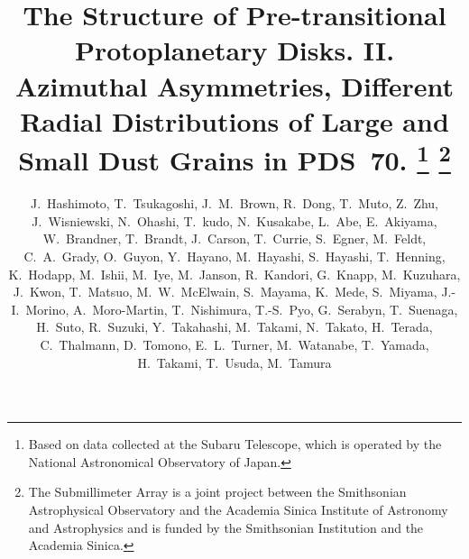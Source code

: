 \documentclass[apj]{emulateapj-rtx4}
\begin{document}
\title{The Structure of Pre-transitional Protoplanetary Disks. II. \\
  Azimuthal Asymmetries, Different Radial Distributions of Large and Small Dust Grains in PDS~70.
  \footnote{Based on data collected at the Subaru Telescope, which is operated by the National Astronomical Observatory of Japan.}
  \footnote{The Submillimeter Array is a joint project between the Smithsonian Astrophysical Observatory and the Academia Sinica Institute of Astronomy and Astrophysics and is funded by the Smithsonian Institution and the Academia Sinica.}
}

  \author{
    J.~Hashimoto, 
    T.~Tsukagoshi, 
    J.~M.~Brown, 
    R.~Dong, 
    T.~Muto, 
    Z.~Zhu, 
    J.~Wisniewski, 
    N.~Ohashi,
    T.~kudo,
    N.~Kusakabe,
    L.~Abe, 
    E.~Akiyama,
    W.~Brandner, 
    T.~Brandt, 
    J.~Carson,
    T.~Currie, 
    S.~Egner, 
    M.~Feldt, 
    C.~A.~Grady, 
    O.~Guyon, 
    Y.~Hayano,
    M.~Hayashi, 
    S.~Hayashi, 
    T.~Henning, 
    K.~Hodapp,
    M.~Ishii,
    M.~Iye, 
    M.~Janson,
    R.~Kandori, 
    G.~Knapp, 
    M.~Kuzuhara,
    J.~Kwon,
    T.~Matsuo,
    M.~W.~McElwain, 
    S.~Mayama, 
    K.~Mede,
    S.~Miyama, 
    J.-I.~Morino,
    A.~Moro-Martin, 
    T.~Nishimura, 
    T.-S.~Pyo,
    G.~Serabyn, 
    T.~Suenaga,
    H.~Suto, 
    R.~Suzuki,
    Y.~Takahashi,
    M.~Takami,
    N.~Takato, 
    H.~Terada, 
    C.~Thalmann, 
    D.~Tomono,
    E.~L.~Turner, 
    M.~Watanabe, 
    T.~Yamada, 
    H.~Takami,
    T.~Usuda,
    M.~Tamura
    }
  
\end{document}
